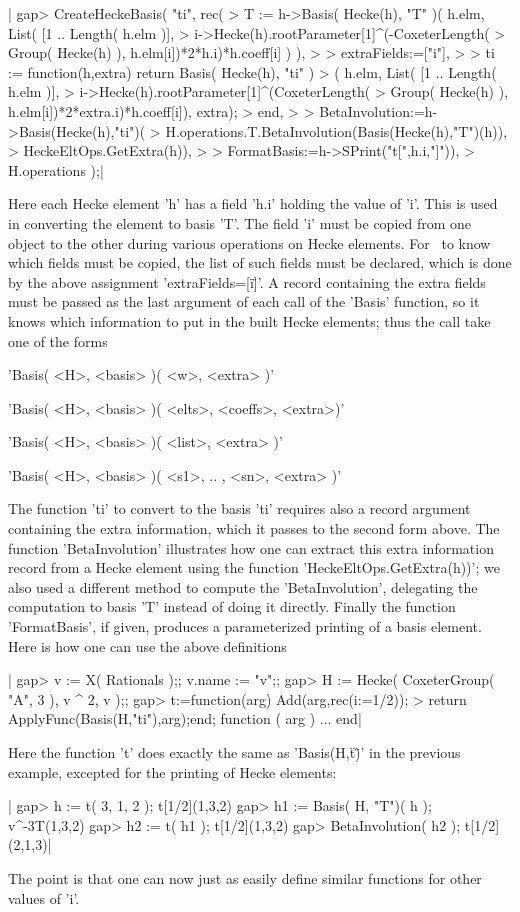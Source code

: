 |    gap> CreateHeckeBasis( "ti", rec(
    > T := h->Basis( Hecke(h), "T" )( h.elm, List( [1 .. Length( h.elm )],
    >  i->Hecke(h).rootParameter[1]^(-CoxeterLength(
    >          Group( Hecke(h) ), h.elm[i])*2*h.i)*h.coeff[i] ) ),
    >
    > extraFields:=["i"],
    >
    > ti := function(h,extra) return Basis( Hecke(h), "ti" )
    >    ( h.elm, List( [1 .. Length( h.elm )],
    >    i->Hecke(h).rootParameter[1]^(CoxeterLength(
    >        Group( Hecke(h) ), h.elm[i])*2*extra.i)*h.coeff[i]), extra);
    >    end,
    >
    > BetaInvolution:=h->Basis(Hecke(h),"ti")(
    >   H.operations.T.BetaInvolution(Basis(Hecke(h),"T")(h)),
    >   HeckeEltOps.GetExtra(h)),
    >
    > FormatBasis:=h->SPrint("t[",h.i,"]")),
    > H.operations );|

Here  each Hecke element  'h' has a  field 'h.i' holding  the value of 'i'.
This  is used in converting the element to basis 'T'. The field 'i' must be
copied  from one  object to  the other  during various  operations on Hecke
elements.  For \CHEVIE\ to  know which fields  must be copied,  the list of
such  fields  must  be  declared,  which  is  done  by the above assignment
'extraFields\:=[\"i\"]'.  A  record  containing  the  extra  fields must be
passed  as the last  argument of each  call of the  'Basis' function, so it
knows  which information to put in the  built Hecke elements; thus the call
take one of the forms

'Basis( <H>, <basis> )( <w>, <extra> )'

'Basis( <H>, <basis> )( <elts>, <coeffs>, <extra>)'

'Basis( <H>, <basis> )( <list>, <extra> )'

'Basis( <H>, <basis> )( <s1>, .. , <sn>, <extra> )'

The  function 'ti'  to convert  to the  basis 'ti'  requires also  a record
argument  containing the extra  information, which it  passes to the second
form  above. The function 'BetaInvolution'  illustrates how one can extract
this  extra  information  record  from  a  Hecke element using the function
'HeckeEltOps.GetExtra(h))';  we also used a different method to compute the
'BetaInvolution',  delegating the computation to basis 'T' instead of doing
it  directly.  Finally  the  function  'FormatBasis',  if given, produces a
parameterized  printing of  a basis  element. Here  is how  one can use the
above definitions\:

|    gap> v := X( Rationals );; v.name := "v";;
    gap> H := Hecke( CoxeterGroup( "A", 3 ), v ^ 2, v );;
    gap> t:=function(arg) Add(arg,rec(i:=1/2));
    >  return ApplyFunc(Basis(H,"ti"),arg);end;
    function ( arg ) ... end|

Here  the function  't' does  exactly the  same as  'Basis(H,\"t\")' in the
previous example, excepted for the printing of Hecke elements:

|    gap> h := t( 3, 1, 2 );
    t[1/2](1,3,2)
    gap> h1 := Basis( H, "T")( h );
    v^-3T(1,3,2)
    gap> h2 := t( h1 );
    t[1/2](1,3,2)
    gap> BetaInvolution( h2 );
    t[1/2](2,1,3)|

The  point is that one can now  just as easily define similar functions for
other values of 'i'.

